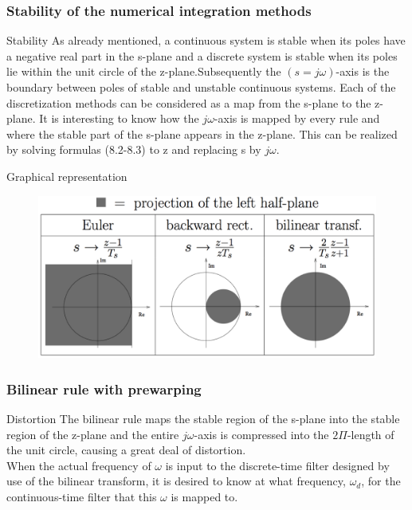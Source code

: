 \begin{frame}
	\frametitle{Stability of the numerical integration methods}
	\begin{block}{Stability}
		As already mentioned, a continuous system is stable when its poles have a negative real part in the s-plane and a discrete system is stable when its poles lie within the unit circle of the z-plane.Subsequently the $(s=j\omega)$-axis is the boundary between poles of stable and unstable continuous systems. Each of the discretization methods can be considered as a map from the s-plane to the z-plane. It is interesting to know how the $j\omega$-axis is mapped by every rule and where the stable part of the s-plane appears in the z-plane. This can be realized by solving formulas (8.2-8.3) to z and replacing s by $j\omega$. 
	\end{block}
\end{frame}

\begin{frame}
	\begin{block}{Graphical representation}
	\begin{figure}
		\centering
		\includegraphics[width=1\linewidth]{Stabiliteit}
	\end{figure}
	\end{block}
\end{frame}


\begin{frame}
	\frametitle{Bilinear rule with prewarping}
	\begin{alertblock}{Distortion}
		The bilinear rule maps the stable region of the s-plane into the stable region of the z-plane and the entire $j\omega$-axis is compressed into the $2\Pi$-length of the unit circle, causing a great deal of distortion.\\
		\vspace{1em}
		When the actual frequency of $\omega$ is input to the discrete-time filter designed by use of the bilinear transform, it is desired to know at what frequency,  $\omega_d$, for the continuous-time filter that this  $\omega$ is mapped to.
	\end{alertblock}
\end{frame}

